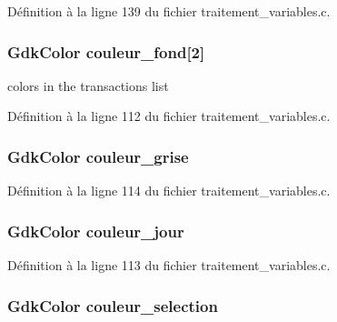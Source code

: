 Définition à la ligne 139 du fichier traitement\_\-variables.c.

\subsubsection[{couleur\_\-fond}]{\setlength{\rightskip}{0pt plus 5cm}GdkColor {\bf couleur\_\-fond}[2]}\label{gsb__file__load_8c_a58089bf9225ae2e274165369f8bc7a00}
colors in the transactions list 

Définition à la ligne 112 du fichier traitement\_\-variables.c.

\subsubsection[{couleur\_\-grise}]{\setlength{\rightskip}{0pt plus 5cm}GdkColor {\bf couleur\_\-grise}}\label{gsb__file__load_8c_a4119417896b5652f640ead3795baac52}


Définition à la ligne 114 du fichier traitement\_\-variables.c.

\subsubsection[{couleur\_\-jour}]{\setlength{\rightskip}{0pt plus 5cm}GdkColor {\bf couleur\_\-jour}}\label{gsb__file__load_8c_a668e8ab17ed4a22af1464c091c2668c2}


Définition à la ligne 113 du fichier traitement\_\-variables.c.

\subsubsection[{couleur\_\-selection}]{\setlength{\rightskip}{0pt plus 5cm}GdkColor {\bf couleur\_\-selection}}\label{gsb__file__load_8c_a35e437a6db69c9160eeb81674971108b}


